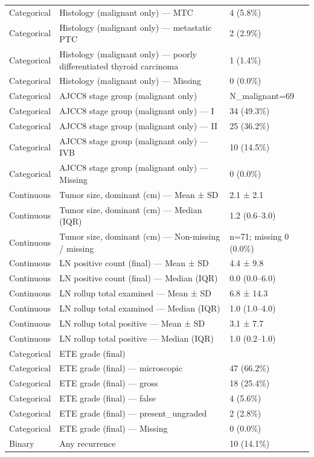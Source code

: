 \begin{table}[htbp]
\begin{tabular}{lll}
Categorical & Histology (malignant only) — MTC & 4 (5.8\%) \\
Categorical & Histology (malignant only) — metastatic PTC & 2 (2.9\%) \\
Categorical & Histology (malignant only) — poorly differentiated thyroid carcinoma & 1 (1.4\%) \\
Categorical & Histology (malignant only) — Missing & 0 (0.0\%) \\
Categorical & AJCC8 stage group (malignant only) & N\_malignant=69 \\
Categorical & AJCC8 stage group (malignant only) — I & 34 (49.3\%) \\
Categorical & AJCC8 stage group (malignant only) — II & 25 (36.2\%) \\
Categorical & AJCC8 stage group (malignant only) — IVB & 10 (14.5\%) \\
Categorical & AJCC8 stage group (malignant only) — Missing & 0 (0.0\%) \\
Continuous & Tumor size, dominant (cm) — Mean ± SD & 2.1 ± 2.1 \\
Continuous & Tumor size, dominant (cm) — Median (IQR) & 1.2 (0.6–3.0) \\
Continuous & Tumor size, dominant (cm) — Non-missing / missing & n=71; missing 0 (0.0\%) \\
Continuous & LN positive count (final) — Mean ± SD & 4.4 ± 9.8 \\
Continuous & LN positive count (final) — Median (IQR) & 0.0 (0.0–6.0) \\
Continuous & LN rollup total examined — Mean ± SD & 6.8 ± 14.3 \\
Continuous & LN rollup total examined — Median (IQR) & 1.0 (1.0–4.0) \\
Continuous & LN rollup total positive — Mean ± SD & 3.1 ± 7.7 \\
Continuous & LN rollup total positive — Median (IQR) & 1.0 (0.2–1.0) \\
Categorical & ETE grade (final) &  \\
Categorical & ETE grade (final) — microscopic & 47 (66.2\%) \\
Categorical & ETE grade (final) — gross & 18 (25.4\%) \\
Categorical & ETE grade (final) — false & 4 (5.6\%) \\
Categorical & ETE grade (final) — present\_ungraded & 2 (2.8\%) \\
Categorical & ETE grade (final) — Missing & 0 (0.0\%) \\
Binary & Any recurrence & 10 (14.1\%) \\

\end{tabular}
\end{table}
